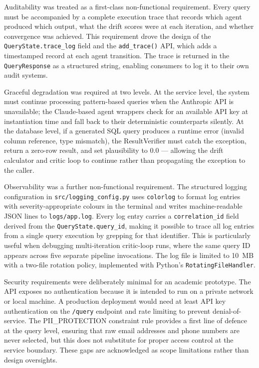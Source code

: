 \documentclass[12pt,a4paper]{report}
\begin{document}
Auditability was treated as a first-class non-functional requirement. Every query must be accompanied by a complete execution trace that records which agent produced which output, what the drift scores were at each iteration, and whether convergence was achieved. This requirement drove the design of the \texttt{QueryState.trace\_log} field and the \texttt{add\_trace()} API, which adds a timestamped record at each agent transition. The trace is returned in the \texttt{QueryResponse} as a structured string, enabling consumers to log it to their own audit systems.

Graceful degradation was required at two levels. At the service level, the system must continue processing pattern-based queries when the Anthropic API is unavailable; the Claude-based agent wrappers check for an available API key at instantiation time and fall back to their deterministic counterparts silently. At the database level, if a generated SQL query produces a runtime error (invalid column reference, type mismatch), the ResultVerifier must catch the exception, return a zero-row result, and set plausibility to 0.0 — allowing the drift calculator and critic loop to continue rather than propagating the exception to the caller.

Observability was a further non-functional requirement. The structured logging configuration in \texttt{src/logging\_config.py} uses \texttt{colorlog} to format log entries with severity-appropriate colours in the terminal and writes machine-readable JSON lines to \texttt{logs/app.log}. Every log entry carries a \texttt{correlation\_id} field derived from the \texttt{QueryState.query\_id}, making it possible to trace all log entries from a single query execution by grepping for that identifier. This is particularly useful when debugging multi-iteration critic-loop runs, where the same query ID appears across five separate pipeline invocations. The log file is limited to 10~MB with a two-file rotation policy, implemented with Python's \texttt{RotatingFileHandler}.

Security requirements were deliberately minimal for an academic prototype. The API exposes no authentication because it is intended to run on a private network or local machine. A production deployment would need at least API key authentication on the \texttt{/query} endpoint and rate limiting to prevent denial-of-service. The PII\_PROTECTION constraint rule provides a first line of defence at the query level, ensuring that raw email addresses and phone numbers are never selected, but this does not substitute for proper access control at the service boundary. These gaps are acknowledged as scope limitations rather than design oversights.
\end{document}
